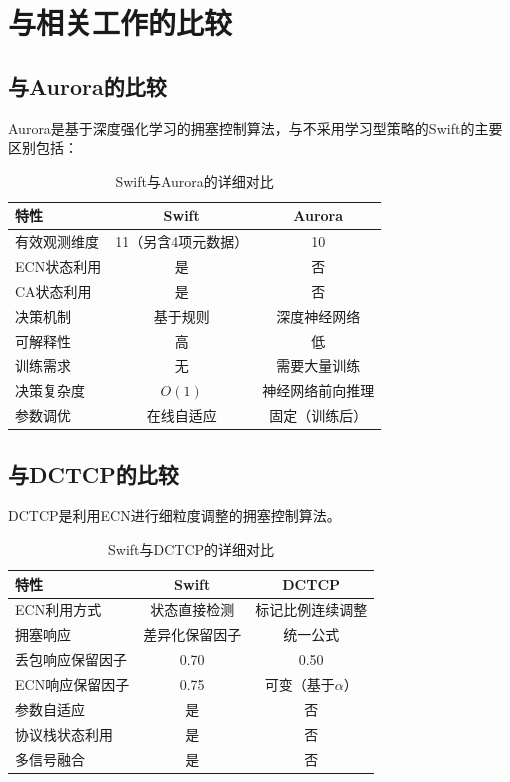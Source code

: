 \section{与相关工作的比较}

\subsection{与Aurora的比较}

Aurora是基于深度强化学习的拥塞控制算法，与不采用学习型策略的Swift的主要区别包括：

\begin{table}[htbp]
\centering
\caption{Swift与Aurora的详细对比}
\label{tab:vs_aurora}
\begin{tabular}{|l|c|c|}
\hline
\textbf{特性} & \textbf{Swift} & \textbf{Aurora} \\
\hline
有效观测维度 & 11（另含4项元数据） & 10 \\
ECN状态利用 & 是 & 否 \\
CA状态利用 & 是 & 否 \\
决策机制 & 基于规则 & 深度神经网络 \\
可解释性 & 高 & 低 \\
训练需求 & 无 & 需要大量训练 \\
决策复杂度 & $O(1)$ & 神经网络前向推理 \\
参数调优 & 在线自适应 & 固定（训练后） \\
\hline
\end{tabular}
\end{table}

\subsection{与DCTCP的比较}

DCTCP是利用ECN进行细粒度调整的拥塞控制算法。

\begin{table}[htbp]
\centering
\caption{Swift与DCTCP的详细对比}
\label{tab:vs_dctcp}
\begin{tabular}{|l|c|c|}
\hline
\textbf{特性} & \textbf{Swift} & \textbf{DCTCP} \\
\hline
ECN利用方式 & 状态直接检测 & 标记比例连续调整 \\
拥塞响应 & 差异化保留因子 & 统一公式 \\
丢包响应保留因子 & 0.70 & 0.50 \\
ECN响应保留因子 & 0.75 & 可变（基于$\alpha$） \\
参数自适应 & 是 & 否 \\
协议栈状态利用 & 是 & 否 \\
多信号融合 & 是 & 否 \\
\hline
\end{tabular}
\end{table}

